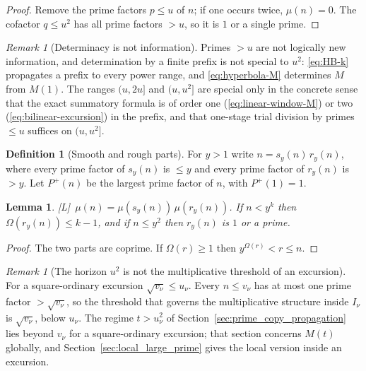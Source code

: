 \documentclass[11pt]{amsart}
\numberwithin{equation}{section}
\theoremstyle{plain}
\newtheorem{lemma}[theorem]{Lemma}
\theoremstyle{definition}
\newtheorem{definition}[theorem]{Definition}
\theoremstyle{remark}
\newtheorem{remark}[theorem]{Remark}
\newcommand{\Pp}{P^{+}}
\newcommand{\tagL}{\textup{[L]}}
\begin{document}
\begin{proof}
Remove the prime factors $p\le u$ of $n$; if one occurs twice, $\mu(n)=0$.
The cofactor $q\le u^2$ has all prime factors $>u$, so it is $1$ or a single
prime.
\end{proof}

\begin{remark}[Determinacy is not information]
\label{rem:information}
Primes $>u$ are not logically new information, and determination by a
finite prefix is not special to $u^2$: \eqref{eq:HB-k} propagates a prefix
to every power range, and \eqref{eq:hyperbola-M} determines $M$ from $M(1)$.
The ranges $(u,2u]$ and $(u,u^2]$ are special only in the concrete sense
that the exact summatory formula is of order one
(\eqref{eq:linear-window-M}) or two (\eqref{eq:bilinear-excursion}) in the
prefix, and that one-stage trial division by primes $\le u$ suffices on
$(u,u^2]$.
\end{remark}

\begin{definition}[Smooth and rough parts]
\label{def:smooth_rough}
For $y>1$ write $n=s_y(n)\,r_y(n)$, where every prime factor of $s_y(n)$
is $\le y$ and every prime factor of $r_y(n)$ is $>y$. Let $\Pp(n)$ be the
largest prime factor of $n$, with $\Pp(1)=1$.
\end{definition}

\begin{lemma}
\label{lem:rough_part}
\tagL\ $\mu(n)=\mu(s_y(n))\,\mu(r_y(n))$. If $n<y^k$ then $\Omega(r_y(n))\le k-1$,
and if $n\le y^2$ then $r_y(n)$ is $1$ or a prime.
\end{lemma}

\begin{proof}
The two parts are coprime. If $\Omega(r)\ge1$ then $y^{\Omega(r)}<r\le n$.
\end{proof}

\begin{remark}[The horizon $u^2$ is not the multiplicative threshold of an excursion]
\label{rem:horizon_inactive}
For a square-ordinary excursion $\sqrt{v_\nu}\le u_\nu$. Every $n\le v_\nu$
has at most one prime factor $>\sqrt{v_\nu}$, so the threshold that governs
the multiplicative structure inside $I_\nu$ is $\sqrt{v_\nu}$, below
$u_\nu$. The regime $t>u_\nu^2$ of Section~\ref{sec:prime_copy_propagation}
lies beyond $v_\nu$ for a square-ordinary excursion; that section concerns
$M(t)$ globally, and Section~\ref{sec:local_large_prime} gives the local
version inside an excursion.
\end{remark}
\end{document}
